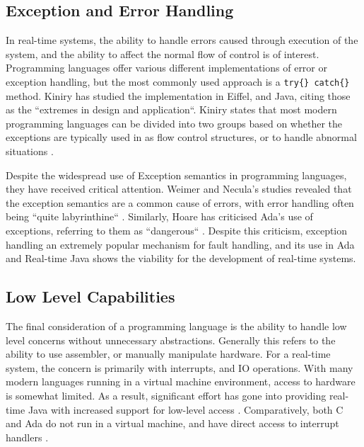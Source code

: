 \subsection{Exception and Error Handling} %
In real-time systems, the ability to handle errors caused through execution of
the system, and the ability to affect the normal flow of control is of
interest. Programming languages offer various different implementations of
error or exception handling, but the most commonly used approach is a 
\texttt{try\{\} catch\{\} } method. Kiniry has studied the implementation in 
Eiffel, and Java, citing those as the ``extremes in design and application``. 
Kiniry states that most modern programming languages can be divided into two
groups based on whether the exceptions are typically used in as flow control
structures, or to handle abnormal situations
\cite{Kiniry:2006:EJE:2124243.2124264}. 
\par\bigskip\noindent
Despite the widespread use of Exception semantics in programming languages,
they have received critical attention. Weimer and Necula's studies revealed
that the exception semantics are a common cause of errors, with error handling
often being ``quite labyrinthine`` \cite{Weimer:2008:ESP:1330017.1330019}. 
Similarly, Hoare has criticised Ada's use of exceptions, referring to them as
``dangerous`` \cite{Hoare:1981:EOC:358549.358561}. Despite this criticism,
exception handling an extremely popular mechanism for fault handling, and its
use in Ada and Real-time Java shows the viability for the development of
real-time systems.

\subsection{Low Level Capabilities} %
The final consideration of a programming language is the ability to handle low
level concerns without unnecessary abstractions. Generally this refers to the
ability to use assembler, or manually manipulate hardware. For a real-time
system, the concern is primarily with interrupts, and IO operations. With many
modern languages running in a virtual machine environment, access to hardware
is somewhat limited. As a result, significant effort has gone into providing
real-time Java with increased support for low-level access \cite{4519616,real-java}. 
Comparatively, both C and Ada do not run in a virtual machine, and have direct
access to interrupt handlers \cite{real-time-systems}.


